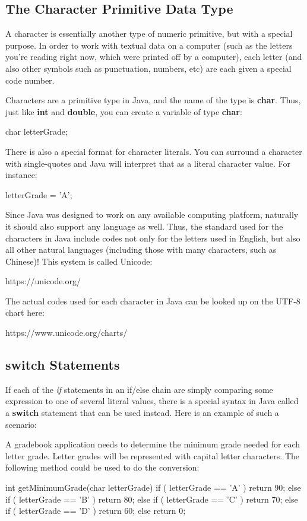 \subsection{The Character Primitive Data Type}

A character is essentially another type of numeric primitive, but with a special purpose. In order to work with textual data on a computer (such as the letters you're reading right now, which were printed off by a computer), each letter (and also other symbols such as punctuation, numbers, etc) are each given a special code number. 

Characters are a primitive type in Java, and the name of the type is \textbf{char}. Thus, just like \textbf{int} and \textbf{double}, you can create a variable of type \textbf{char}:

\begin{code}
char letterGrade;
\end{code}

There is also a special format for character literals. You can surround a character with single-quotes and Java will interpret that as a literal character value. For instance:

\begin{code}
letterGrade = 'A';
\end{code}

Since Java was designed to work on any available computing platform, naturally it should also support any language as well. Thus, the standard used for the characters in Java include codes not only for the letters used in English, but also all other natural languages (including those with many characters, such as Chinese)! This system is called Unicode:

https://unicode.org/

The actual codes used for each character in Java can be looked up on the UTF-8 chart here:

https://www.unicode.org/charts/


\subsection{switch Statements}

If each of the \textit{if} statements in an if/else chain are simply comparing some expression to one of several literal values, there is a special syntax in Java called a \textbf{switch} statement that can be used instead. Here is an example of such a scenario:

\begin{exa}
A gradebook application needs to determine the minimum grade needed for each letter grade. Letter grades will be represented with capital letter characters. The following method could be used to do the conversion:

\begin{code}
int getMinimumGrade(char letterGrade) {
  if ( letterGrade == 'A' ) {
    return 90;
  } else if ( letterGrade == 'B' ) {
    return 80;
  } else if ( letterGrade == 'C' ) {
    return 70;
  } else if ( letterGrade == 'D' ) {
    return 60;
  } else {
    return 0;
  }
}
\end{code}
\end{exa}


